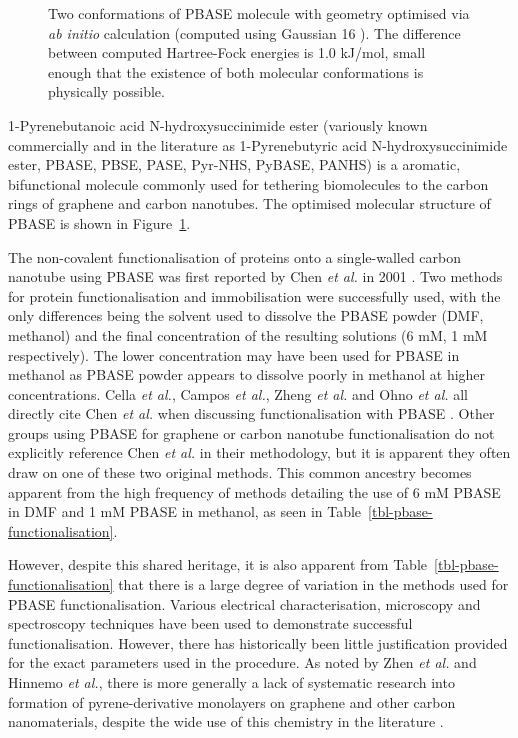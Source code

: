 \documentclass[
  a4paper,
]{scrbook}
\begin{document}
\begin{figure}
\begin{minipage}[t]{0.47\linewidth}
{{}

}

\end{minipage}%

\caption{\label{fig-pbase-structure}Two conformations of PBASE molecule
with geometry optimised via \emph{ab initio} calculation (computed using
Gaussian 16 \autocite{g16}). The difference between computed
Hartree-Fock energies is 1.0 kJ/mol, small enough that the existence of
both molecular conformations is physically possible.}

\end{figure}

1-Pyrenebutanoic acid N-hydroxysuccinimide ester (variously known
commercially and in the literature as 1-Pyrenebutyric acid
N-hydroxysuccinimide ester, PBASE, PBSE, PASE, Pyr-NHS, PyBASE, PANHS)
is a aromatic, bifunctional molecule commonly used for tethering
biomolecules to the carbon rings of graphene and carbon nanotubes. The
optimised molecular structure of PBASE is shown in
Figure~\ref{fig-pbase-structure}.

The non-covalent functionalisation of proteins onto a single-walled
carbon nanotube using PBASE was first reported by Chen \emph{et al.} in
2001 \autocite{Chen2001}. Two methods for protein functionalisation and
immobilisation were successfully used, with the only differences being
the solvent used to dissolve the PBASE powder (DMF, methanol) and the
final concentration of the resulting solutions (6 mM, 1 mM
respectively). The lower concentration may have been used for PBASE in
methanol as PBASE powder appears to dissolve poorly in methanol at
higher concentrations. Cella \emph{et al.}, Campos \emph{et al.}, Zheng
\emph{et al.} and Ohno \emph{et al.} all directly cite Chen \emph{et
al.} when discussing functionalisation with PBASE
\autocite{Cella2010,Campos2019,Zheng2016,Ohno2010}. Other groups using
PBASE for graphene or carbon nanotube functionalisation do not
explicitly reference Chen \emph{et al.} in their methodology, but it is
apparent they often draw on one of these two original methods. This
common ancestry becomes apparent from the high frequency of methods
detailing the use of 6 mM PBASE in DMF and 1 mM PBASE in methanol, as
seen in Table~\ref{tbl-pbase-functionalisation}.

However, despite this shared heritage, it is also apparent from
Table~\ref{tbl-pbase-functionalisation} that there is a large degree of
variation in the methods used for PBASE functionalisation. Various
electrical characterisation, microscopy and spectroscopy techniques have
been used to demonstrate successful functionalisation. However, there
has historically been little justification provided for the exact
parameters used in the procedure. As noted by Zhen \emph{et al.} and
Hinnemo \emph{et al.}, there is more generally a lack of systematic
research into formation of pyrene-derivative monolayers on graphene and
other carbon nanomaterials, despite the wide use of this chemistry in
the literature \autocite{Zhen2018,Hinnemo2017}.
\end{document}
